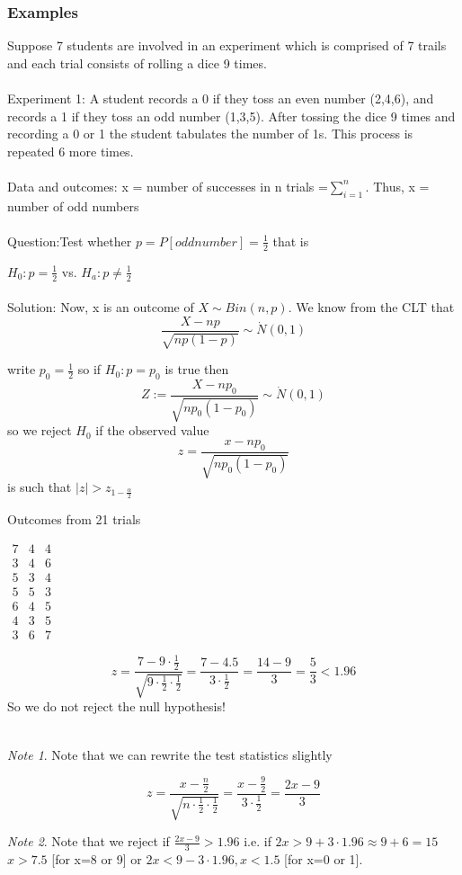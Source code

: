 \documentclass[12pt,a4paper]{article}
\theoremstyle{regla}
\theoremstyle{remark}
\newtheorem{notes}{Note}[section]
\theoremstyle{definition}
\theoremstyle{nonumberbreak}
\begin{document}
\subsubsection{Examples}
\begin{xmpl}
Suppose 7 students are involved in an experiment which is comprised of 7 trails and each trial consists of rolling a dice 9 times.\\
\\
Experiment 1: A student records a 0 if they toss an even number (2,4,6), and records a 1 if they toss an odd number (1,3,5). After tossing the dice 9 times and recording a 0 or 1 the student tabulates the number of 1s. This process is repeated 6 more times. \\
\\
Data and outcomes: 
x = number of successes in n trials =$\sum_{i=1}^n$.
Thus, x = number of odd numbers\\\\

Question:Test whether $p=P[odd number]=\frac{1}{2}$ that is 
		
$H_0: p=\frac{1}{2}$ vs. $H_a: p\neq \frac{1}{2}$
 \\\\
Solution:
Now, x is an outcome of $X \sim Bin(n,p)$. We know from the CLT that
$$\frac{X-np}{\sqrt{np(1-p)}} \sim\dot N(0,1)$$

write $p_0=\frac{1}{2}$ so if $H_0:p=p_0$ is true then
$$Z:=\frac{X-np_0}{\sqrt{np_0(1-p_0)}}\sim\dot N(0,1)$$
so we reject $H_0$ if the observed value
$$z=\frac{x-np_0}{\sqrt{np_0(1-p_0)}}$$
is such that 
$\left | z\right | >z_{1-\frac{\alpha}{2}}$



Outcomes from 21 trials 


$\begin{matrix}
7	& 4 & 4\\
3 & 4 & 6\\
5 & 3 & 4\\
5 & 5 & 3\\
6 & 4 & 5\\
4 & 3 & 5\\
3 & 6 & 7
\end{matrix}$

$$z=\frac{7-9\cdot \frac{1}{2}}{\sqrt{9\cdot\frac{1}{2}\cdot \frac{1}{2}}}=\frac{7-4.5}{3\cdot\frac{1}{2}}=\frac{14-9}{3}=\frac{5}{3} < 1.96$$
So we do not reject the null hypothesis! 
\\\\
\begin{notes}
Note that we can rewrite the test statistics slightly

$$z=\frac{x-\frac{n}{2}}{\sqrt{n\cdot\frac{1}{2}\cdot\frac{1}{2}}}=\frac{x-\frac{9}{2}}{3\cdot\frac{1}{2}}=\frac{2x-9}{3}$$
\end{notes}
\begin{notes}
Note that we reject if $\frac{2x-9}{3}>1.96$ i.e. if $2x>9+3\cdot1.96 \approx 9+6=15$\\

$x>7.5$ [for x=8 or 9] or $2x<9-3\cdot1.96, x<1.5$ [for x=0 or 1].
\end{notes}
\end {xmpl}
\end{document}
